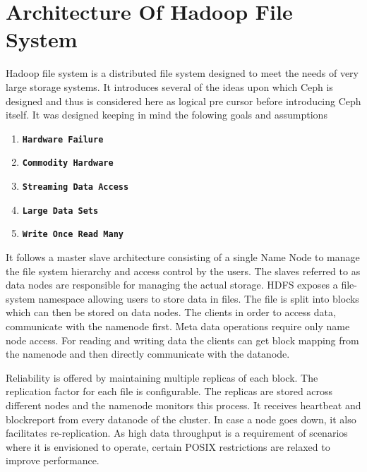 \documentclass[a4paper,10pt]{article}
\begin{document}
\newpage
\section{Architecture Of Hadoop File System}

Hadoop file system\cite{borthakur2008hdfs} is a distributed file system designed to meet the needs of very large storage systems. It introduces several of the ideas upon which Ceph is designed and thus is considered here as logical pre cursor before introducing Ceph itself. It was designed keeping in mind the folowing goals and assumptions
\begin{enumerate}[1]

    \item  \textbf{\texttt{Hardware Failure }}  
    
    \item  \textbf{\texttt{Commodity Hardware }} 
    
    \item  \textbf{\texttt{Streaming Data Access}}
    
    \item  \textbf{\texttt{Large Data Sets }}

    \item  \textbf{\texttt{Write Once Read Many }}
\end{enumerate}


It follows a master slave architecture consisting of a single Name Node to manage the file system hierarchy and access control by the users. The slaves referred to as data nodes are responsible for managing the actual storage. HDFS exposes a file-system namespace allowing users to store data in files. The file is split into blocks which can then be stored on data nodes. The clients in order to access data, communicate with the namenode first. Meta data operations require only name node access. For reading and writing data the clients can get block mapping from the namenode and then directly communicate with the datanode.

Reliability is offered by maintaining multiple replicas of each block. The replication factor for each file is configurable. The replicas are stored across different nodes and the namenode monitors this process. It receives heartbeat and blockreport from every datanode of the cluster. In case a node goes down, it also facilitates re-replication. As high data throughput is a requirement of scenarios where it is envisioned to operate, certain POSIX restrictions are relaxed to improve performance.
\end{document}
